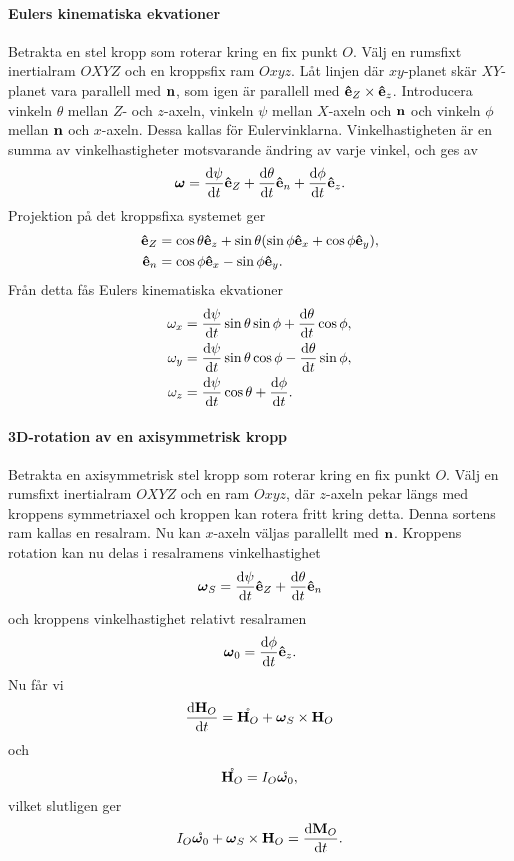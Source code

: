 \paragraph{Eulers kinematiska ekvationer}
Betrakta en stel kropp som roterar kring en fix punkt $O$. Välj en rumsfixt inertialram $OXYZ$ och en kroppsfix ram $Oxyz$. Låt linjen där $xy$-planet skär $XY$-planet vara parallell med $\vb{n}$, som igen är parallell med $\vu{e}_{Z}\times\vu{e}_{z}$. Introducera vinkeln $\theta$ mellan $Z$- och $z$-axeln, vinkeln $\psi$ mellan $X$-axeln och $\vb{n}$ och vinkeln $\phi$ mellan $\vb{n}$ och $x$-axeln. Dessa kallas för Eulervinklarna. Vinkelhastigheten är en summa av vinkelhastigheter motsvarande ändring av varje vinkel, och ges av
\begin{align*}
	\vb*{\omega} = \dv{\psi}{t}\vu{e}_{Z} + \dv{\theta}{t}\vu{e}_{n} + \dv{\phi}{t}\vu{e}_{z}.
\end{align*}
Projektion på det kroppsfixa systemet ger
\begin{align*}
	\vu{e}_{Z} &= \cos{\theta}\vu{e}_{z} + \sin{\theta}(\sin{\phi}\vu{e}_{x} + \cos{\phi}\vu{e}_{y}), \\
	\vu{e}_{n} &= \cos{\phi}\vu{e}_{x} - \sin{\phi}\vu{e}_{y}.
\end{align*}
Från detta fås Eulers kinematiska ekvationer
\begin{align*}
	\omega_{x} &= \dv{\psi}{t}\sin{\theta}\sin{\phi} + \dv{\theta}{t}\cos{\phi}, \\
	\omega_{y} &= \dv{\psi}{t}\sin{\theta}\cos{\phi} - \dv{\theta}{t}\sin{\phi}, \\
	\omega_{z} &= \dv{\psi}{t}\cos{\theta} + \dv{\phi}{t}.
\end{align*}

\paragraph{3D-rotation av en axisymmetrisk kropp}
Betrakta en axisymmetrisk stel kropp som roterar kring en fix punkt $O$. Välj en rumsfixt inertialram $OXYZ$ och en ram $Oxyz$, där $z$-axeln pekar längs med kroppens symmetriaxel och kroppen kan rotera fritt kring detta. Denna sortens ram kallas en resalram. Nu kan $x$-axeln väljas parallellt med $\vb{n}$. Kroppens rotation kan nu delas i resalramens vinkelhastighet
\begin{align*}
	\vb*{\omega}_{S} = \dv{\psi}{t}\vu{e}_{Z} + \dv{\theta}{t}\vu{e}_{n}
\end{align*}
och kroppens vinkelhastighet relativt resalramen
\begin{align*}
	\vb*{\omega}_{0} = \dv{\phi}{t}\vu{e}_{z}.
\end{align*}
Nu får vi
\begin{align*}
	\dv{\vb{H}_{O}}{t} = \mathring{\vb{H}_{O}} + \vb*{\omega}_{S}\times\vb{H}_{O}
\end{align*}
och
\begin{align*}
	\mathring{\vb{H}_{O}} = I_{O}\mathring{\vb*{\omega}_{0}},
\end{align*}
vilket slutligen ger
\begin{align*}
	I_{O}\mathring{\vb*{\omega}_{0}} + \vb*{\omega}_{S}\times\vb{H}_{O} = \dv{\vb{M}_{O}}{t}.
\end{align*}


